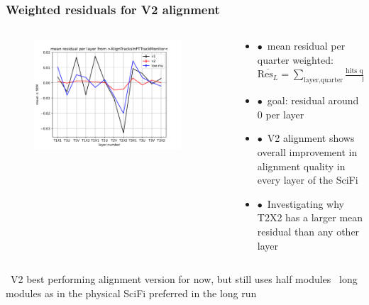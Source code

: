 \documentclass[aspectratio=1610, 12pt]{beamer}
\begin{document}
\begin{frame}\frametitle{Weighted residuals for V2 alignment}
    \begin{columns}
      \begin{column}[c]{0.48\textwidth}
        \begin{figure}
          \centering
          \includegraphics[width=0.9\textwidth]{2023-mar-9-DPG/meanResidual_AlignTracks_weighted.pdf}
        \end{figure}
      \end{column}
      \begin{column}{0.48\textwidth}
        \begin{itemize}
          \item $\bullet$\, mean residual per quarter weighted: $
              \overline{\text{Res}_{L}} = \sum_{\text{layer}, \text{quarter}} \frac{\text{hits quarter of layer}}{\text{hits layer}}$
          \item $\bullet$\, goal: residual around 0 per layer
          \item $\bullet$\, V2 alignment shows overall improvement in alignment quality in every layer of the SciFi
          \item $\bullet$\, Investigating why T2X2 has a larger mean residual than any other layer
        \end{itemize}
      \end{column}
    \end{columns}
  \to\, V2 best performing alignment version for now, but still uses half modules
  \to\, long modules as in the physical SciFi preferred in the long run
\end{frame}
\end{document}
